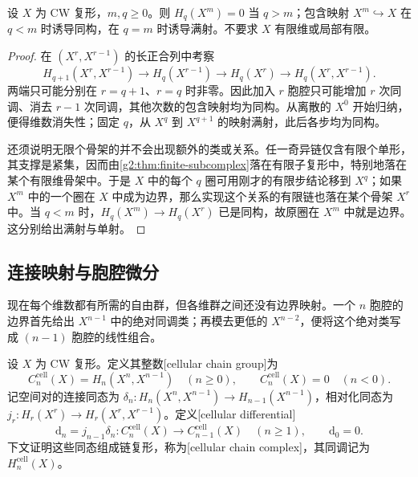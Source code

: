 \begin{proposition}\label{g2:prop:skeletal-homology-stability}
	设 \(X\) 为 CW 复形，\(m,q\ge0\)。则 \(H_q(X^m)=0\) 当 \(q>m\)；包含映射 \(X^m\hookrightarrow X\) 在 \(q<m\) 时诱导同构，在 \(q=m\) 时诱导满射。不要求 \(X\) 有限维或局部有限。
\end{proposition}
\begin{proof}
	在 \((X^r,X^{r-1})\) 的长正合列中考察
	\[
		H_{q+1}(X^r,X^{r-1})\longrightarrow H_q(X^{r-1})
		\longrightarrow H_q(X^r)\longrightarrow H_q(X^r,X^{r-1}).
	\]
	两端只可能分别在 \(r=q+1\)、\(r=q\) 时非零。因此加入 \(r\) 胞腔只可能增加 \(r\) 次同调、消去 \(r-1\) 次同调，其他次数的包含映射均为同构。从离散的 \(X^0\) 开始归纳，便得维数消失性；固定 \(q\)，从 \(X^q\) 到 \(X^{q+1}\) 的映射满射，此后各步均为同构。

	还须说明无限个骨架的并不会出现额外的类或关系。任一奇异链仅含有限个单形，其支撑是紧集，因而由\cref{g2:thm:finite-subcomplex}落在有限子复形中，特别地落在某个有限维骨架中。于是 \(X\) 中的每个 \(q\) 圈可用刚才的有限步结论移到 \(X^q\)；如果 \(X^m\) 中的一个圈在 \(X\) 中成为边界，那么实现这个关系的有限链也落在某个骨架 \(X^r\) 中。当 \(q<m\) 时，\(H_q(X^m)\to H_q(X^r)\) 已是同构，故原圈在 \(X^m\) 中就是边界。这分别给出满射与单射。
\end{proof}

\subsection{连接映射与胞腔微分}
\label{g2:subsec:0301:02}
现在每个维数都有所需的自由群，但各维群之间还没有边界映射。一个 \(n\) 胞腔的边界首先给出 \(X^{n-1}\) 中的绝对同调类；再模去更低的 \(X^{n-2}\)，便将这个绝对类写成 \((n-1)\) 胞腔的线性组合。

\begin{definition}[胞腔链复形]\label{g2:def:cellular-chain-complex}
	设 \(X\) 为 CW 复形。定义其整数[cellular chain group]为
	\[
		C_n^{\mathrm{cell}}(X)=H_n(X^n,X^{n-1})\quad(n\ge0),\qquad
		C_n^{\mathrm{cell}}(X)=0\quad(n<0).
	\]
	记空间对的连接同态为 \(\delta_n:H_n(X^n,X^{n-1})\to H_{n-1}(X^{n-1})\)，相对化同态为 \(j_r:H_r(X^r)\to H_r(X^r,X^{r-1})\)。定义[cellular differential]
	\begin{equation}\label{g2:eq:cellular-differential}
		\mathrm{d}_n=j_{n-1}\delta_n:C_n^{\mathrm{cell}}(X)\longrightarrow C_{n-1}^{\mathrm{cell}}(X)\quad(n\ge1),\qquad \mathrm{d}_0=0.
	\end{equation}
	下文证明这些同态组成链复形，称为[cellular chain complex]，其同调记为 \(H_n^{\mathrm{cell}}(X)\)。
\end{definition}

